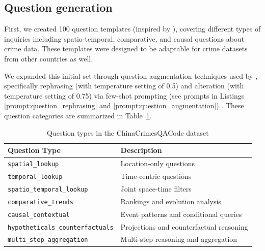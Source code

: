 \subsection{Question generation}

First, we created 100 question templates (inspired by \citep{Dai2024QASTKG, Contractor2020QATourism}), covering different types of inquiries including spatio-temporal, comparative, and causal questions about crime data. These templates were designed to be adaptable for crime datasets from other countries as well.

We expanded this initial set through question augmentation techniques used by \cite{Yin2024MuMathCode, Li2024MuggleMath, Jain2024MetaFineTuning}, specifically rephrasing (with temperature setting of 0.5) and alteration (with temperature setting of 0.75) via few-shot prompting (see prompts in Listings \ref{prompt:question_rephrasing} and \ref{prompt:question_augmentation})
. These question categories are summarized in Table~\ref{tab:question_types}. %


\begin{table}[H]
\centering
\footnotesize
\small
\begin{tabular}{ll}
  \toprule
\textbf{Question Type} & \textbf{Description} \\
\midrule
\texttt{spatial\_lookup} & Location-only questions \\
\texttt{temporal\_lookup} & Time-centric questions \\
\texttt{spatio\_temporal\_lookup} & Joint space-time filters \\
\texttt{comparative\_trends} & Rankings and evolution analysis \\
\texttt{causal\_contextual} & Event patterns and conditional queries \\
\texttt{hypotheticals\_counterfactuals} & Projections and counterfactual reasoning \\
\texttt{multi\_step\_aggregation} & Multi-step reasoning and aggregation \\
\bottomrule
\end{tabular}
\caption{Question types in the ChinaCrimesQACode dataset}
\label{tab:question_types}
\end{table}


